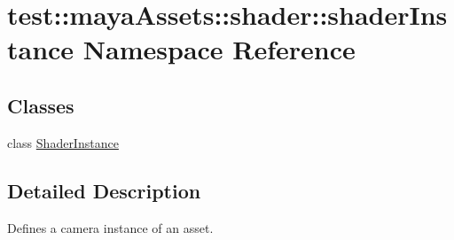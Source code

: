 \hypertarget{namespacetest_1_1mayaAssets_1_1shader_1_1shaderInstance}{\section{test\-:\-:maya\-Assets\-:\-:shader\-:\-:shader\-Instance \-Namespace \-Reference}
\label{d3/de4/namespacetest_1_1mayaAssets_1_1shader_1_1shaderInstance}
}
\subsection*{\-Classes}
\begin{DoxyCompactItemize}
\item 
class \hyperlink{classtest_1_1mayaAssets_1_1shader_1_1shaderInstance_1_1ShaderInstance}{\-Shader\-Instance}
\end{DoxyCompactItemize}


\subsection{\-Detailed \-Description}
\begin{DoxyVerb}
Defines a camera instance of an asset.
\end{DoxyVerb}
 